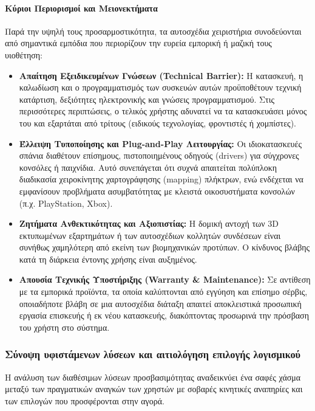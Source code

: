 \documentclass[twoside, a4paper, 11pt]{article}
\newcommand{\textlatin}[1]{\textenglish{#1}}
\begin{document}
\paragraph{Κύριοι Περιορισμοί και Μειονεκτήματα}
Παρά την υψηλή τους προσαρμοστικότητα, τα αυτοσχέδια χειριστήρια συνοδεύονται από σημαντικά εμπόδια που περιορίζουν την ευρεία εμπορική ή μαζική τους υιοθέτηση:

\begin{itemize}
    \item \textbf{Απαίτηση Εξειδικευμένων Γνώσεων (\textlatin{Technical Barrier}):} Η κατασκευή, η καλωδίωση και ο προγραμματισμός των συσκευών αυτών προϋποθέτουν τεχνική κατάρτιση, δεξιότητες ηλεκτρονικής και γνώσεις προγραμματισμού. Στις περισσότερες περιπτώσεις, ο τελικός χρήστης αδυνατεί να τα κατασκευάσει μόνος του και εξαρτάται από τρίτους (ειδικούς τεχνολογίας, φροντιστές ή χομπίστες).
    
    \item \textbf{Έλλειψη Τυποποίησης και \textlatin{Plug-and-Play} Λειτουργίας:} Οι ιδιοκατασκευές σπάνια διαθέτουν επίσημους, πιστοποιημένους οδηγούς (\textlatin{drivers}) για σύγχρονες κονσόλες ή παιχνίδια. Αυτό συνεπάγεται ότι συχνά απαιτείται πολύπλοκη διαδικασία χειροκίνητης χαρτογράφησης (\textlatin{mapping}) πλήκτρων, ενώ ενδέχεται να εμφανίσουν προβλήματα ασυμβατότητας με κλειστά οικοσυστήματα κονσολών (π.χ. \textlatin{PlayStation, Xbox}).
    
    \item \textbf{Ζητήματα Ανθεκτικότητας και Αξιοπιστίας:} Η δομική αντοχή των \textlatin{3D} εκτυπωμένων εξαρτημάτων ή των αυτοσχέδιων κολλητών συνδέσεων είναι συνήθως χαμηλότερη από εκείνη των βιομηχανικών προτύπων. Ο κίνδυνος βλάβης κατά τη διάρκεια έντονης χρήσης είναι αυξημένος.
    
    \item \textbf{Απουσία Τεχνικής Υποστήριξης (\textlatin{Warranty \& Maintenance}):} Σε αντίθεση με τα εμπορικά προϊόντα, τα οποία καλύπτονται από εγγύηση και επίσημο σέρβις, οποιαδήποτε βλάβη σε μια αυτοσχέδια διάταξη απαιτεί αποκλειστικά προσωπική εργασία επισκευής ή εκ νέου κατασκευής, διακόπτοντας προσωρινά την πρόσβαση του χρήστη στο σύστημα.
\end{itemize}

\raggedbottom
\subsubsection{Σύνοψη υφιστάμενων λύσεων και αιτιολόγηση επιλογής λογισμικού}
Η ανάλυση των διαθέσιμων λύσεων προσβασιμότητας αναδεικνύει ένα σαφές χάσμα μεταξύ των πραγματικών αναγκών των χρηστών με σοβαρές κινητικές αναπηρίες και των επιλογών που προσφέρονται
στην αγορά.
\end{document}
